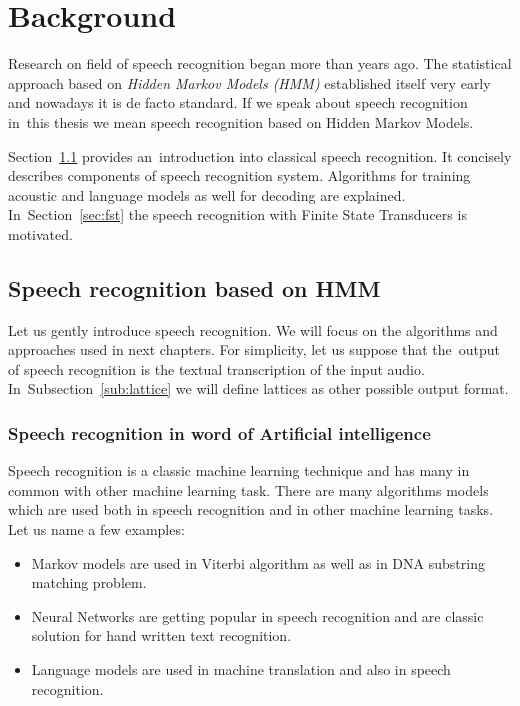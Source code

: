 \chapter{Background}
\label{cha:background}

% 
% 

Research on field of speech recognition began more than  years ago. The statistical approach based on {\it Hidden Markov Models (HMM)} established itself very early and nowadays it is de facto standard. If we speak about speech recognition in~this thesis we mean speech recognition based on Hidden Markov Models. 

Section~\ref{sec:general_introduction} provides an~introduction into classical speech recognition. It concisely describes components of speech recognition system. Algorithms for training acoustic and language models as well for decoding are explained. In~Section~\ref{sec:fst} the speech recognition with Finite State Transducers is motivated.

\section{Speech recognition based on HMM} 
\label{sec:general_introduction}
Let us gently introduce speech recognition. We will focus on the algorithms and approaches used in next chapters. For simplicity,
let us suppose that the~output of speech recognition is the textual transcription of the input audio. In~Subsection~\ref{sub:lattice} we will define
lattices as other possible output format.



\subsection*{Speech recognition in word of Artificial intelligence}
\label{sub:intro_ml}
Speech recognition is a classic machine learning technique and has many in common with other machine learning task. There are many algorithms models which are used both in speech recognition and in other machine learning tasks.
Let us name a few examples:
\begin{itemize}
    \item Markov models are used in Viterbi algorithm as well as in DNA substring matching problem.
    \item Neural Networks are getting popular in speech recognition and are classic solution for hand written text recognition.
    \item Language models are used in machine translation and also in speech recognition. 
\end{itemize}

